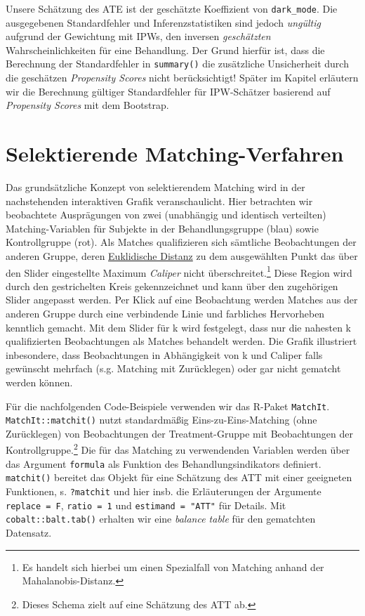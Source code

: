 \documentclass[
  a4paper,
  DIV=11,
  oneside]{scrreprt}
\begin{document}
Unsere Schätzung des ATE ist der geschätzte Koeffizient von
\texttt{dark\_mode}. Die ausgegebenen Standardfehler und
Inferenzstatistiken sind jedoch \emph{ungültig} aufgrund der Gewichtung
mit IPWs, den inversen \emph{geschätzten} Wahrscheinlichkeiten für eine
Behandlung. Der Grund hierfür ist, dass die Berechnung der
Standardfehler in \texttt{summary()} die zusätzliche Unsicherheit durch
die geschätzen \emph{Propensity Scores} nicht berücksichtigt! Später im
Kapitel erläutern wir die Berechnung gültiger Standardfehler für
IPW-Schätzer basierend auf \emph{Propensity Scores} mit dem Bootstrap.

\section{Selektierende
Matching-Verfahren}\label{selektierende-matching-verfahren}

Das grundsätzliche Konzept von selektierendem Matching wird in der
nachstehenden interaktiven Grafik veranschaulicht. Hier betrachten wir
beobachtete Ausprägungen von zwei (unabhängig und identisch verteilten)
Matching-Variablen für Subjekte in der Behandlungsgruppe (blau) sowie
Kontrollgruppe (rot). Als Matches qualifizieren sich sämtliche
Beobachtungen der anderen Gruppe, deren
\href{https://de.wikipedia.org/wiki/Euklidischer_Abstand}{Euklidische
Distanz} zu dem ausgewählten Punkt das über den Slider eingestellte
Maximum \emph{Caliper} nicht überschreitet.\footnote{Es handelt sich
  hierbei um einen Spezialfall von Matching anhand der
  Mahalanobis-Distanz.} Diese Region wird durch den gestrichelten Kreis
gekennzeichnet und kann über den zugehörigen Slider angepasst werden.
Per Klick auf eine Beobachtung werden Matches aus der anderen Gruppe
durch eine verbindende Linie und farbliches Hervorheben kenntlich
gemacht. Mit dem Slider für k wird festgelegt, dass nur die nahesten k
qualifizierten Beobachtungen als Matches behandelt werden. Die Grafik
illustriert inbesondere, dass Beobachtungen in Abhängigkeit von k und
Caliper falls gewünscht mehrfach (s.g. Matching mit Zurücklegen) oder
gar nicht gematcht werden können.

Für die nachfolgenden Code-Beispiele verwenden wir das R-Paket
\texttt{MatchIt}. \texttt{MatchIt::matchit()} nutzt standardmäßig
Eins-zu-Eins-Matching (ohne Zurücklegen) von Beobachtungen der
Treatment-Gruppe mit Beobachtungen der Kontrollgruppe.\footnote{Dieses
  Schema zielt auf eine Schätzung des ATT ab.} Die für das Matching zu
verwendenden Variablen werden über das Argument \texttt{formula} als
Funktion des Behandlungsindikators definiert. \texttt{matchit()}
bereitet das Objekt für eine Schätzung des ATT mit einer geeigneten
Funktionen, s. \texttt{?matchit} und hier insb. die Erläuterungen der
Argumente \texttt{replace\ =\ F}, \texttt{ratio\ =\ 1} und
\texttt{estimand\ =\ "ATT"} für Details. Mit \texttt{cobalt::balt.tab()}
erhalten wir eine \emph{balance table} für den gematchten Datensatz.
\end{document}
